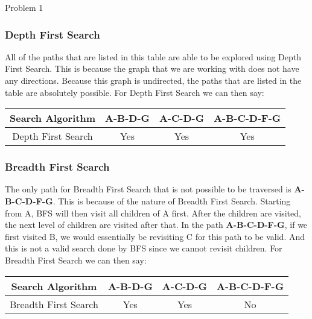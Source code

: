 \begin{problem}{Problem 1}
    \clearpage

    \begin{highlight}
        \subsubsection*{Depth First Search}

        All of the paths that are listed in this table are able to be explored using Depth First Search. This is because the graph that we are working with does not have any directions. Because this graph is undirected,
        the paths that are listed in the table are absolutely possible. For Depth First Search we can then say: \vspace*{1em}

        \begin{center}
            \begin{tabular}[h]{|c|c|c|c|}
                \hline Search Algorithm & \textbf{A-B-D-G} & \textbf{A-C-D-G} & \textbf{A-B-C-D-F-G} \\ \hline
                Depth First Search & Yes & Yes & Yes \\ \hline
            \end{tabular}
        \end{center}

        \subsubsection*{Breadth First Search}
        
        The only path for Breadth First Search that is not possible to be traversed is \textbf{A-B-C-D-F-G}. This is because of the nature of Breadth First Search. Starting from A, BFS will then visit 
        all children of A first. After the children are visited, the next level of children are visited after that. In the path \textbf{A-B-C-D-F-G}, if we first visited B, we would essentially be revisiting
        C for this path to be valid. And this is not a valid search done by BFS since we cannot revisit children. For Breadth First Search we can then say:

        \begin{center}
            \begin{tabular}[h]{|c|c|c|c|}
                \hline Search Algorithm & \textbf{A-B-D-G} & \textbf{A-C-D-G} & \textbf{A-B-C-D-F-G} \\ \hline
                Breadth First Search & Yes & Yes & No \\ \hline
            \end{tabular}
        \end{center}


\end{highlight}
\end{problem}
